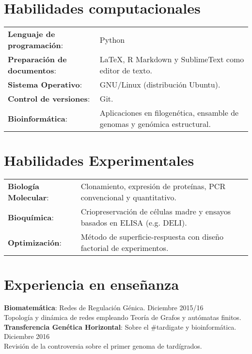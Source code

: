\documentclass[margin,line]{res}
\begin{document}
\begin{resume}
\section{\sc Habilidades computacionales}
\begin{tabular}{ l l }
	{\bf Lenguaje de programación}: & Python\\%
	{\bf Preparación de documentos}: & LaTeX, R Markdown y SublimeText como editor de texto.\\
	{\bf Sistema Operativo}: & GNU/Linux (distribución Ubuntu).\\ %
	{\bf Control de versiones}: & Git.\\ %
	{\bf Bioinformática}: & Aplicaciones en filogenética, ensamble de genomas y genómica estructural.\\	%
\end{tabular}

\section{\sc Habilidades Experimentales}
\begin{tabular}{ l l }
	{\bf Biología Molecular}: & Clonamiento, expresión de proteínas, PCR convencional y quantitativo.\\
	{\bf Bioquímica}: & Criopreservación de células madre y ensayos basados en ELISA (e.g. DELI).\\
	{\bf Optimización}: & Método de superficie-respuesta con diseño factorial de experimentos.\\
\end{tabular}
		
		\section{\sc Experiencia en enseñanza}
			{\bf Biomatemática}: Redes de Regulación Génica. \hfill {Diciembre 2015/16}\\ Topología y dinámica de redes empleando Teoría de Grafos y autómatas finitos. \\[4pt] 
			{\bf Transferencia Genética Horizontal}: Sobre el \#tardigate y bioinformática. \hfill {Diciembre 2016}\\ Revisión de la controversia sobre el primer genoma de tardígrados.\\
		

\end{resume}
\end{document}
